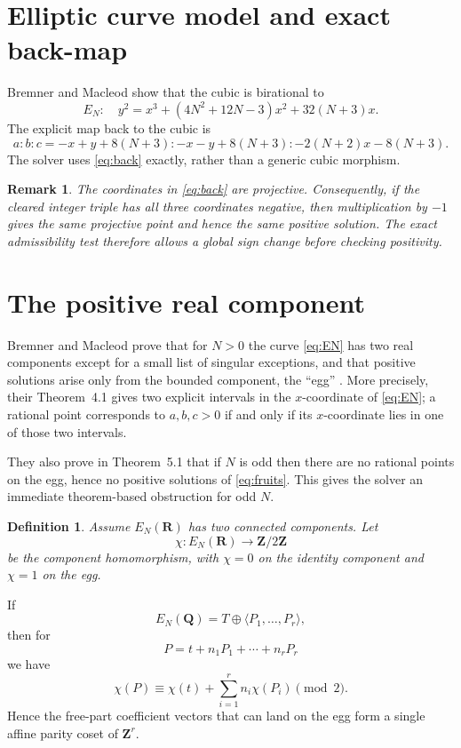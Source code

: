 \documentclass[11pt]{article}
\newtheorem{remark}[theorem]{Remark}
\newtheorem{definition}[theorem]{Definition}
\newcommand{\Q}{\mathbf Q}
\newcommand{\R}{\mathbf R}
\newcommand{\Z}{\mathbf Z}
\begin{document}
\section{Elliptic curve model and exact back-map}
Bremner and Macleod show that the cubic is birational to \cite{BremnerMacleod2014}
\begin{equation}\label{eq:EN}
E_N:\quad y^2=x^3+(4N^2+12N-3)x^2+32(N+3)x.
\end{equation}
The explicit map back to the cubic is
\begin{equation}\label{eq:back}
a:b:c=-x+y+8(N+3): -x-y+8(N+3): -2(N+2)x-8(N+3).
\end{equation}
The solver uses \eqref{eq:back} exactly, rather than a generic cubic morphism.

\begin{remark}
The coordinates in \eqref{eq:back} are projective. Consequently, if the cleared integer triple has all three coordinates negative, then multiplication by $-1$ gives the same projective point and hence the same positive solution. The exact admissibility test therefore allows a global sign change before checking positivity.
\end{remark}

\section{The positive real component}
Bremner and Macleod prove that for $N>0$ the curve \eqref{eq:EN} has two real components except for a small list of singular exceptions, and that positive solutions arise only from the bounded component, the ``egg'' \cite{BremnerMacleod2014}. More precisely, their Theorem~4.1 gives two explicit intervals in the $x$-coordinate of \eqref{eq:EN}; a rational point corresponds to $a,b,c>0$ if and only if its $x$-coordinate lies in one of those two intervals.

They also prove in Theorem~5.1 that if $N$ is odd then there are no rational points on the egg, hence no positive solutions of \eqref{eq:fruits}. This gives the solver an immediate theorem-based obstruction for odd $N$.

\begin{definition}
Assume $E_N(\R)$ has two connected components. Let
\[
\chi:E_N(\R)\to\Z/2\Z
\]
be the component homomorphism, with $\chi=0$ on the identity component and $\chi=1$ on the egg.
\end{definition}

If
\[
E_N(\Q)=T\oplus \langle P_1,\dots,P_r\rangle,
\]
then for
\[
P=t+n_1P_1+\cdots+n_rP_r
\]
we have
\begin{equation}\label{eq:component}
\chi(P)\equiv \chi(t)+\sum_{i=1}^r n_i\chi(P_i)\pmod 2.
\end{equation}
Hence the free-part coefficient vectors that can land on the egg form a single affine parity coset of $\Z^r$.
\end{document}

